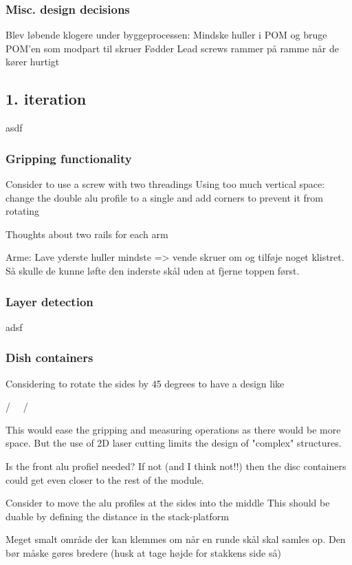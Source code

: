 \documentclass{sigchi}
\begin{document}
	
	\subsubsection{Misc. design decisions}
		Blev løbende klogere under byggeprocessen:
			Mindske huller i POM og bruge POM'en som modpart til skruer
			Fødder
			Lead screws rammer på ramme når de kører hurtigt
	
	
	\subsection{1. iteration}
	asdf
		\subsubsection{Gripping functionality}
			Consider to use a screw with two threadings
			Using too much vertical space:
				change the double alu profile to a single and add corners to prevent it from rotating
		
			Thoughts about two rails for each arm
			
		Arme: Lave yderste huller mindste => vende skruer om og tilføje noget klistret. Så skulle de kunne løfte den inderste skål uden at fjerne toppen først.
		
		\subsubsection{Layer detection}
		adsf
				
		\subsubsection{Dish containers}	
		Considering to rotate the sides by 45 degrees to have a design like
		
		/   \
		\   /
		
			This would ease the gripping and measuring operations as there would be more space. But the use of 2D laser cutting limits the design of "complex" structures.
			
			
		Is the front alu profiel needed? If not (and I think not!!) then the disc containers could get even closer to the rest of the module.
		
		
		Consider to move the alu profiles at the sides into the middle
			This should be duable by defining the distance in the stack-platform
		
		
		Meget smalt område der kan klemmes om når en runde skål skal samles op. Den bør måske gøres bredere (husk at tage højde for stakkens side så)
		
\end{document}
